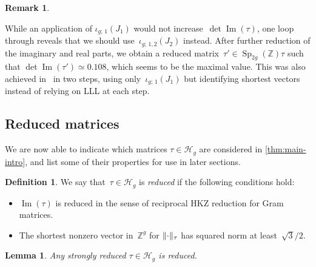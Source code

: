 \documentclass[12pt,oneside]{amsart}
\numberwithin{equation}{section}
\newtheorem{lem}[equation]{Lemma}
\theoremstyle{definition}
\newtheorem{defn}[equation]{Definition}
\newtheorem{rem}[equation]{Remark}
\newcommand{\Z}{\mathbb{Z}}
\newcommand{\Half}{\mathcal{H}}
\newcommand{\embedsp}[2]{\iota_{#1;\,#2}}
\DeclareMathOperator{\im}{Im}
\DeclareMathOperator{\Sp}{Sp}
\DeclarePairedDelimiter{\norm}{\|}{\|}
\begin{document}
\begin{rem}
\begin{displaymath}
  \end{displaymath}

  While an application of $\embedsp{g}{1}(J_1)$ would not
  increase~$\det\im(\tau)$, one loop through  reveals
  that we should use~$\embedsp{g}{1,2}(J_2)$ instead. After further reduction
  of the imaginary and real parts, we obtain a reduced
  matrix~$\tau'\in \Sp_{2g}(\Z)\tau$ such that $\det\im(\tau')\simeq 0.108$,
  which seems to be the maximal value. This was also achieved
  in~\cite[§4.2]{frauendienerEfficientComputationMultidimensional2019} in two
  steps, using only~$\embedsp{g}{1}(J_1)$ but identifying shortest vectors
  instead of relying on LLL at each step.
\end{rem}

\subsection{Reduced matrices}
\label{subsec:properties}

We are now able to indicate which matrices $\tau\in \Half_g$ are considered in
\cref{thm:main-intro}, and list some of their properties for use in later
sections.

\begin{defn}
  \label{def:reduced-tau}
  We say that~$\tau\in \Half_g$ is \emph{reduced} if the following conditions
  hold:
  \begin{itemize}
  \item $\im(\tau)$ is reduced in the sense of reciprocal HKZ reduction for
    Gram matrices.
  \item The shortest nonzero vector in~$\Z^g$ for $\norm{\cdot}_\tau$ has
    squared norm at least~$\sqrt{3}/2$.
  \end{itemize}
\end{defn}

\begin{lem}
  \label{lem:strong-implies-red}
  Any strongly reduced $\tau\in \Half_g$ is reduced.
\end{lem}
\end{document}
